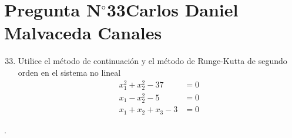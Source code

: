 \section{Pregunta N$^{\circ}$33\qquad Carlos Daniel Malvaceda Canales}

\begin{frame}
	\begin{enumerate}\setcounter{enumi}{32}
		\item

		      Utilice el método de continuación y el método de
		      Runge-Kutta de segundo orden en el sistema no lineal
		      \begin{align*}
			      x^{2}_{1}+x^{2}_{2}-37 & =0 \\
			      x_{1}-x^2_{2}-5        & =0 \\
			      x_{1}+x_{2}+x_{3}-3    & =0
		      \end{align*}
	\end{enumerate}

	\begin{solution}
		.
	\end{solution}
\end{frame}